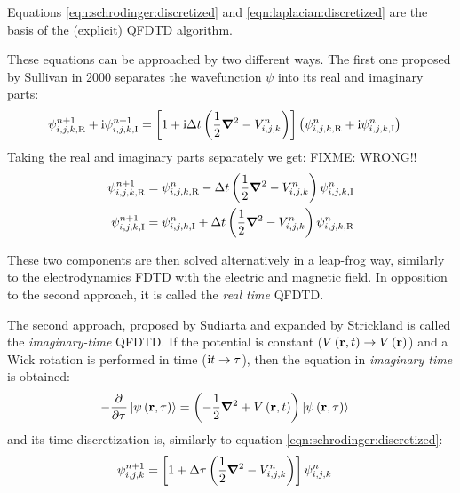 Equations \eqref{eqn:schrodinger:discretized} and
\eqref{eqn:laplacian:discretized} are the basis of the (explicit) QFDTD
algorithm.


These equations can be approached by two different ways. The first
one proposed by Sullivan\cite{Sullivan2000} in 2000 separates the wavefunction
$\psi$ into its real and imaginary parts:
\begin{align}
      \psi_{i,j,k,\textrm{R}}^{n+1}
+ \textrm{i} \psi_{i,j,k,\textrm{I}}^{n+1}
& =
    \left[ 
        1 + \textrm{i} \Delta t \left(  \frac{1}{2} \bm{\nabla}^2 - V_{i,j,k}^{n}  \right)
     \right] \left( 
              \psi_{i,j,k,\textrm{R}}^{n}
        + \textrm{i} \psi_{i,j,k,\textrm{I}}^{n}
     \right)
\end{align}
Taking the real and imaginary parts separately we get:
FIXME: WRONG!!
\begin{subequations}
\begin{align}
\psi_{i,j,k,\textrm{R}}^{n+1} & =
    \psi_{i,j,k,\textrm{R}}^{n}
    - \Delta t \left(  \frac{1}{2} \bm{\nabla}^2 - V_{i,j,k}^{n}  \right)
                \psi_{i,j,k,\textrm{I}}^{n}
\\
\psi_{i,j,k,\textrm{I}}^{n+1} & =
    \psi_{i,j,k,\textrm{I}}^{n}
    + \Delta t \left(  \frac{1}{2} \bm{\nabla}^2 - V_{i,j,k}^{n}  \right)
                \psi_{i,j,k,\textrm{R}}^{n}
\end{align}
\end{subequations}




These two components are then solved alternatively in a leap-frog way,
similarly to the electrodynamics FDTD with the electric and magnetic field. In
opposition to the second approach, it is called the \textit{real time} QFDTD.

The second approach, proposed by Sudiarta\cite{Sudiarta2007} and expanded by
Strickland\cite{Strickland2010} is called the \textit{imaginary-time} QFDTD.
If the potential is constant ($V\left( \textbf{r}, t \right) \rightarrow V\left( \textbf{r} \right)$) and a Wick
rotation is performed in time ($\textrm{i} t \rightarrow \tau$), then the \schrodinger
equation in \textit{imaginary time} is obtained:
\begin{align}
- \frac{\partial^{{}} }{\partial {\tau}^{{}}} \left| \psi\left( \textbf{r}, \tau \right) \right>
    & = \left( -\frac{1}{2} \bm{\nabla}^2 + V\left( \textbf{r}, t \right)  \right) \left| \psi\left( \textbf{r}, \tau \right) \right>
\label{eqn:schrodinger:imaginary}
\end{align}
and its time discretization is, similarly to equation
\eqref{eqn:schrodinger:discretized}:
\begin{align}
\psi_{i,j,k}^{n+1} & =
    \left[ 
        1 + \Delta \tau \left(  \frac{1}{2} \bm{\nabla}^2 - V_{i,j,k}^{n}  \right)
     \right] \psi_{i,j,k}^{n}
\label{eqn:schrodinger:imaginary:discretized}
\end{align}


